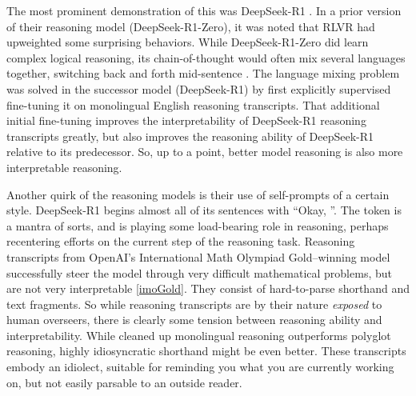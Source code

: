 The most prominent demonstration of this was DeepSeek-R1
\cite{deepseekai2025deepseek}. In a prior version of their reasoning model
(DeepSeek-R1-Zero), it was noted that RLVR had upweighted some surprising
behaviors. While DeepSeek-R1-Zero did learn complex logical reasoning, its
chain-of-thought would often mix several languages together, switching back and
forth mid-sentence \cite{deepseekai2025deepseek}. The language mixing problem
was solved in the successor model (DeepSeek-R1) by first explicitly supervised
fine-tuning it on monolingual English reasoning transcripts. That additional
initial fine-tuning improves the interpretability of DeepSeek-R1 reasoning
transcripts greatly, but also improves the reasoning ability of DeepSeek-R1
relative to its predecessor. So, up to a point, better model reasoning is also
more interpretable reasoning.

Another quirk of the reasoning models is their use of self-prompts of a certain
style. DeepSeek-R1 begins almost all of its sentences with ``Okay, ''. The
token is a mantra of sorts, and is playing some load-bearing role in reasoning,
perhaps recentering efforts on the current step of the reasoning task.
Reasoning transcripts from OpenAI's International Math Olympiad Gold--winning
model successfully steer the model through very difficult mathematical
problems, but are not very interpretable \ref{imoGold}. They consist of
hard-to-parse shorthand and text fragments. So while reasoning transcripts are
by their nature \emph{exposed} to human overseers, there is clearly some
tension between reasoning ability and interpretability. While cleaned up
monolingual reasoning outperforms polyglot reasoning, highly idiosyncratic
shorthand might be even better. These transcripts embody an idiolect, suitable
for reminding you what you are currently working on, but not easily parsable to
an outside reader.


